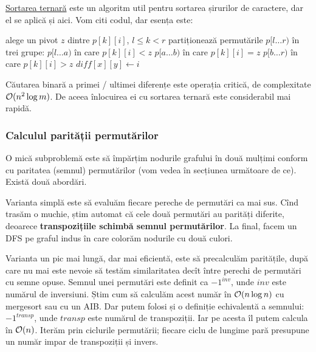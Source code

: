 \documentclass[../main.tex]{subfiles}
\begin{document}
\href{https://en.wikipedia.org/wiki/Multi-key_quicksort}{Sortarea ternară} este un algoritm util pentru sortarea șirurilor de caractere, dar el se aplică și aici. Vom citi codul, dar esența este:

\begin{algorithm}[H]
  \caption{Sortarea ternară a unei colecții de permutări.}
  \begin{algorithmic}[1]
     \Comment{permutările $p[l \dots r)$ coincid pînă la poziția $i-1$}
      \State alege un pivot $z$ dintre $p[k][i]$, $l \leq k < r$
      \State partiționează permutările $p[l \dots r)$ în trei grupe:
      \State \hspace{\algorithmicindent} $p[l \dots a)$ în care $p[k][i] < z$
      \State \hspace{\algorithmicindent} $p[a \dots b)$ în care $p[k][i] = z$
      \State \hspace{\algorithmicindent} $p[b \dots r)$ în care $p[k][i] > z$
        \State $diff[x][y] \gets i$ 
      \EndFor
      \State {}
      \State {}
      \State {}
    \EndProcedure
  \end{algorithmic}
\end{algorithm}

Căutarea binară a primei / ultimei diferențe este operația critică, de complexitate $\mathcal{O}(n^2 \log m)$. De aceea înlocuirea ei cu sortarea ternară este considerabil mai rapidă.

\subsubsection*{Calculul parității permutărilor}

O mică subproblemă este să împărțim nodurile grafului în două mulțimi conform cu paritatea (semnul) permutărilor (vom vedea în secțiunea următoare de ce). Există două abordări.

Varianta simplă este să evaluăm fiecare pereche de permutări ca mai sus. Cînd trasăm o muchie, știm automat că cele două permutări au parități diferite, deoarece \textbf{transpozițiile schimbă semnul permutărilor}. La final, facem un DFS pe graful indus în care colorăm nodurile cu două culori.

Varianta un pic mai lungă, dar mai eficientă, este să precalculăm paritățile, după care nu mai este nevoie să testăm similaritatea decît între perechi de permutări cu semne opuse. Semnul unei permutări este definit ca $-1^{inv}$, unde $inv$ este numărul de inversiuni. Știm cum să calculăm acest număr în $\mathcal{O}(n \log n)$ cu mergesort sau cu un AIB. Dar putem folosi și o definiție echivalentă a semnului: $-1^{transp}$, unde $transp$ este numărul de transpoziții. Iar pe acesta îl putem calcula în $\mathcal{O}(n)$. Iterăm prin ciclurile permutării; fiecare ciclu de lungime pară presupune un număr impar de transpoziții și invers.
\end{document}
